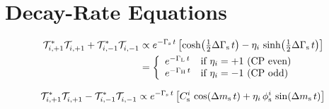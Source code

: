 \section{Decay-Rate Equations}
\label{sec:pheno_equations}


\begin{equation}
  \begin{aligned}
    \label{eq:timeCPEvenOdd}
    \timeAmp[i,+1]^*\timeAmp[i,+1]^{\phantom{*}} + \timeAmp[i,-1]^*\timeAmp[i,-1]^{\phantom{*}}
      &\propto \eGst\left[ \cDGs - \eta_i\,\sDGs \right]  \\
      &= \left\{\begin{array}{ll}
                  e^{-\GL\,t}  &  \text{if } \eta_i = +1 \text{ (CP even)}  \\
                  e^{-\GH\,t}  &  \text{if } \eta_i = -1 \text{ (CP odd)}
         \end{array}\right.
  \end{aligned}
\end{equation}

\begin{equation}
  \label{eq:timeOscill}
  \timeAmp[i,+1]^*\timeAmp[i,+1]^{\phantom{*}} - \timeAmp[i,-1]^*\timeAmp[i,-1]^{\phantom{*}}
    \propto \eGst\left[ \Csi\,\cDms + \eta_i\,\phisi\,\sDms \right]
\end{equation}

